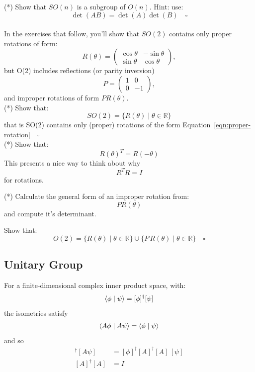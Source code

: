 \documentclass[12pt]{article}
\begin{document}
\exercise (*) Show that $SO(n)$ is a subgroup of $O(n)$.  Hint: use:
$$\det(AB) = \det(A) \det(B) \quad \square$$\\[5pt]

\noindent
In the exercises that follow, you'll show that $SO(2)$ contains only proper rotations of form:
\begin{equation}
\label{eqn:proper-rotation}
R(\theta) = \begin{pmatrix} \cos\theta & -\sin\theta \\ \sin\theta & \cos\theta \end{pmatrix},
\end{equation}
but O(2) includes reflections (or parity inversion)
\begin{equation}
\label{eqn:parity-inversion}
P = \begin{pmatrix} 1 & 0 \\ 0 & -1 \end{pmatrix},
\end{equation}
and improper rotations of form $P R(\theta)$.\\[5pt]

\exercise (*) Show that:
$$SO(2) = \bigl\{R(\theta) \mid \theta \in \mathbb{R} \bigr\}$$
that is SO(2) contains only (proper) rotations of the form Equation~\ref{eqn:proper-rotation}$\quad \square$\\[5pt]

\exercise (*) Show that:
$$R(\theta)^T = R(-\theta)$$
This presents a nice way to think about why
$$R^T R = I$$
for rotations.

\exercise (*) Calculate the general form of an improper rotation from:
$$P R(\theta)$$
and compute it's determinant.

\exercise  Show that:
$$O(2) = \bigl\{R(\theta) \mid \theta \in \mathbb{R}\bigr\}
\cup \bigl\{P\,R(\theta) \mid \theta \in \mathbb{R}\bigr\} \quad \square$$

\subsection*{Unitary Group}

For a finite-dimensional complex inner product space, with:
$$\braket{\phi \mid \psi} = [\phi]^\dagger [\psi]$$
the isometries satisfy
$$\braket{A\phi \mid A\psi} = \braket{\phi \mid \psi}$$
and so
\begin{align*}
  [A\phi]^\dagger [A\psi] &= [\phi]^\dagger [A]^\dagger [A]\,[\psi] \\
  [A]^\dagger [A] &= I
\end{align*}
\end{document}

